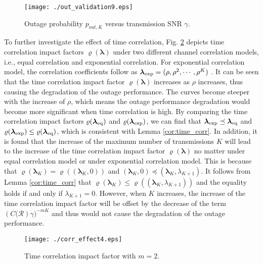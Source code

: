\documentclass[12pt,onecolumn,draftcls]{IEEEtran}
\newcommand{\bs}{\boldsymbol}
\begin{document}
\begin{figure}
  \centering
  \texttt{[image: ./out\_validation9.eps]}\\
  \caption{Outage probability $p_{out,K}$ versus transmission SNR $\gamma$.}\label{fig:out_s}
\end{figure}

To further investigate the effect of time correlation, Fig. \ref{fig:corr} depicts time correlation impact factors $\varrho(\bs \lambda)$ under two different channel correlation models, i.e., equal correlation and exponential correlation. For exponential correlation model, the correlation coefficients follow as $\bs \lambda_{\rm exp}=(\rho,\rho^2,\cdots,\rho^K)$ \cite{aalo1995performance,kim2011optimal}. It can be seen that the time correlation impact factor $\varrho(\bs \lambda)$ increases as $\rho$ increases, thus causing the degradation of the outage performance. The curves become steeper with the increase of $\rho$, which means the outage performance degradation would become more significant when time correlation is high. By comparing the time correlation impact factors $\varrho(\bs \lambda_{\rm eq})$ and $\varrho(\bs \lambda_{\rm exp})$, we can find that $\bs\lambda_{\rm exp} \preceq \bs\lambda_{\rm eq} $ and  $\varrho(\bs \lambda_{\rm exp}) \le \varrho(\bs \lambda_{\rm eq})$, which is consistent with Lemma \ref{cor:time_corr}. In addition, it is found that the increase of the maximum number of transmissions $K$ will lead to the increase of the time correlation impact factor $\varrho(\bs \lambda)$ no matter under equal correlation model or under exponential correlation model. This is because that $\varrho(\bs \lambda_{K}) = \varrho((\bs \lambda_K,0))$ and $(\bs \lambda_K,0) \preceq (\bs \lambda_K,\lambda_{K+1})$. It follows from Lemma \ref{cor:time_corr} that $\varrho(\bs \lambda_K) \le \varrho((\bs \lambda_K,\lambda_{K+1}))$ and the equality holds if and only if $\lambda_{K+1}=0$. However, when $K$ increases, the increase of the time correlation impact factor will be offset by the decrease of the term $\left( C(\mathcal R \right ) \gamma)^{-mK}$ and thus would not cause the degradation of the outage performance.

\begin{figure}
  \centering
  \texttt{[image: ./corr\_effect4.eps]}
  \caption{Time correlation impact factor with $m=2$.}\label{fig:corr}
\end{figure}
\end{document}
